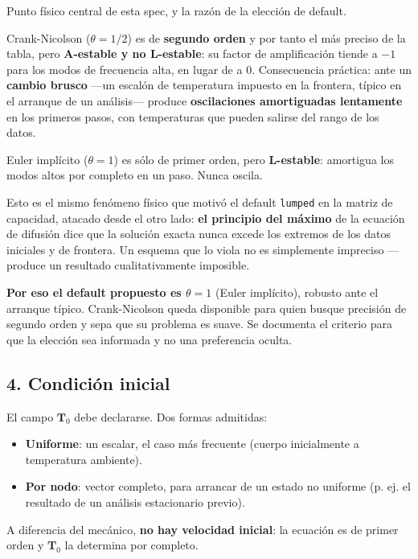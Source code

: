 \documentclass[11pt,letterpaper,oneside]{report}
\begin{document}
Punto físico central de esta spec, y la razón de la elección de default.

Crank-Nicolson ($\theta = 1/2$) es de \textbf{segundo orden} y por tanto el más preciso de la tabla, pero \textbf{A-estable y no L-estable}: su factor de amplificación tiende a $-1$ para los modos de frecuencia alta, en lugar de a $0$. Consecuencia práctica: ante un \textbf{cambio brusco} ---un escalón de temperatura impuesto en la frontera, típico en el arranque de un análisis--- produce \textbf{oscilaciones amortiguadas lentamente} en los primeros pasos, con temperaturas que pueden salirse del rango de los datos.

Euler implícito ($\theta = 1$) es sólo de primer orden, pero \textbf{L-estable}: amortigua los modos altos por completo en un paso. Nunca oscila.

Esto es el mismo fenómeno físico que motivó el default \texttt{lumped} en la matriz de capacidad, atacado desde el otro lado: \textbf{el principio del máximo} de la ecuación de difusión dice que la solución exacta nunca excede los extremos de los datos iniciales y de frontera. Un esquema que lo viola no es simplemente impreciso --- produce un resultado cualitativamente imposible.

\textbf{Por eso el default propuesto es $\theta = 1$} (Euler implícito), robusto ante el arranque típico. Crank-Nicolson queda disponible para quien busque precisión de segundo orden y sepa que su problema es suave. Se documenta el criterio para que la elección sea informada y no una preferencia oculta.

\subsection{4. Condición inicial}

El campo $\mathbf T_0$ debe declararse. Dos formas admitidas:

\begin{itemize}
  \item \textbf{Uniforme}: un escalar, el caso más frecuente (cuerpo inicialmente a temperatura ambiente).
  \item \textbf{Por nodo}: vector completo, para arrancar de un estado no uniforme (p. ej. el resultado de un análisis estacionario previo).
\end{itemize}

A diferencia del mecánico, \textbf{no hay velocidad inicial}: la ecuación es de primer orden y $\mathbf T_0$ la determina por completo.
\end{document}
